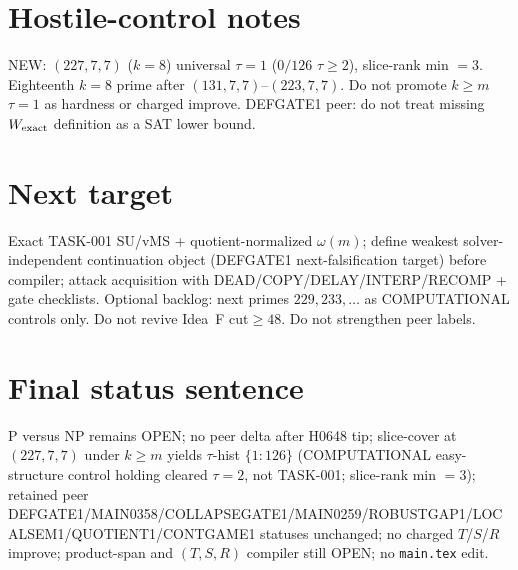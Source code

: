 \documentclass[11pt]{article}
\begin{document}
\section*{Hostile-control notes}
NEW: $(227,7,7)$ ($k{=}8$) universal $\tau{=}1$ ($0/126$ $\tau{\ge}2$), slice-rank min $=3$.
Eighteenth $k{=}8$ prime after $(131,7,7)$--$(223,7,7)$.
Do not promote $k{\ge}m$ $\tau{=}1$ as hardness or charged improve.
DEFGATE1 peer: do not treat missing $W_{\rm exact}$ definition as a SAT lower bound.

\section*{Next target}
Exact TASK-001 SU/vMS + quotient-normalized $\omega(m)$; define weakest solver-independent
continuation object (DEFGATE1 next-falsification target) before compiler;
attack acquisition with DEAD/COPY/DELAY/INTERP/RECOMP + gate checklists.
Optional backlog: next primes $229,233,\ldots$ as COMPUTATIONAL controls only.
Do not revive Idea~F cut$\ge48$. Do not strengthen peer labels.

\section*{Final status sentence}
P versus NP remains OPEN; no peer delta after H0648 tip; slice-cover at $(227,7,7)$ under $k{\ge}m$ yields $\tau$-hist $\{1{:}126\}$ (COMPUTATIONAL easy-structure control holding cleared $\tau{=}2$, not TASK-001; slice-rank min $=3$); retained peer DEFGATE1/MAIN0358/COLLAPSEGATE1/MAIN0259/ROBUSTGAP1/LOCALSEM1/QUOTIENT1/CONTGAME1 statuses unchanged; no charged $T$/$S$/$R$ improve; product-span and $(T,S,R)$ compiler still OPEN; no \texttt{main.tex} edit.
\end{document}
